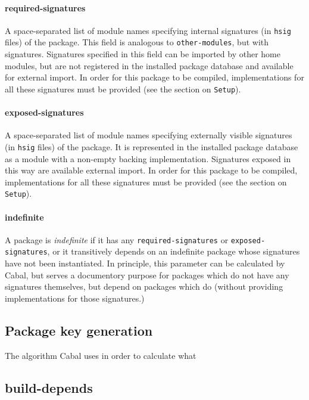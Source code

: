 \documentclass{article}
\begin{document}
\paragraph{required-signatures}  A space-separated list of module names
specifying internal signatures (in \texttt{hsig} files) of the package.
This field is analogous to \texttt{other-modules}, but with signatures.
Signatures specified in this field can be imported by other home
modules, but are not registered in the installed package database and
available for external import.  In order for this package to be
compiled, implementations for all these signatures must be provided (see
the section on \texttt{Setup}).

\paragraph{exposed-signatures}  A space-separated list of module names
specifying externally visible signatures (in \texttt{hsig} files) of the package.  It is
represented in the installed package database as a module with a
non-empty backing implementation.  Signatures exposed in this way are
available external import.  In order for this package to be compiled,
implementations for all these signatures must be provided (see the
section on \texttt{Setup}).

\paragraph{indefinite}  A package is \emph{indefinite} if it has any
\texttt{required-signatures} or \texttt{exposed-signatures}, or it
transitively depends on an indefinite package whose signatures have
not been instantiated.  In principle, this parameter can be calculated
by Cabal, but serves a documentory purpose for packages which do not
have any signatures themselves, but depend on packages which do (without
providing implementations for those signatures.)

\subsection{Package key generation}

The algorithm Cabal uses in order to calculate what 

\subsection{build-depends}
\end{document}
